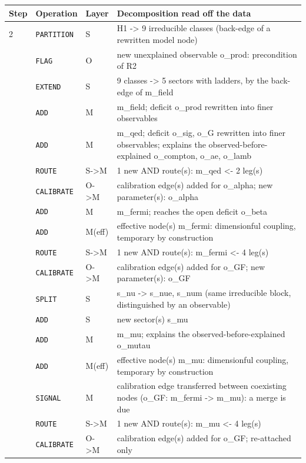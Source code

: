 \begin{longtable}{@{}p{0.6cm}p{1.9cm}p{1.3cm}p{10.5cm}@{}}\toprule
Step & Operation & Layer & Decomposition read off the data \\\midrule\endhead
2 & \texttt{PARTITION} & S & H1 -> 9 irreducible classes (back-edge of a rewritten model node) \\
\addlinespace[2pt]
3 & \texttt{FLAG} & O & new unexplained observable o\_prod: precondition of R2 \\
\addlinespace[2pt]
4 & \texttt{EXTEND} & S & 9 classes -> 5 sectors with ladders, by the back-edge of m\_field \\
 & \texttt{ADD} & M & m\_field; deficit o\_prod rewritten into finer observables \\
\addlinespace[2pt]
5 & \texttt{ADD} & M & m\_qed; deficit o\_sig, o\_G rewritten into finer observables; explains the observed-before-explained o\_compton, o\_ae, o\_lamb \\
 & \texttt{ROUTE} & S->M & 1 new AND route(s): m\_qed <- 2 leg(s) \\
 & \texttt{CALIBRATE} & O->M & calibration edge(s) added for o\_alpha; new parameter(s): o\_alpha \\
\addlinespace[2pt]
6 & \texttt{ADD} & M & m\_fermi; reaches the open deficit o\_beta \\
 & \texttt{ADD} & M(eff) & effective node(s) m\_fermi: dimensionful coupling, temporary by construction \\
 & \texttt{ROUTE} & S->M & 1 new AND route(s): m\_fermi <- 4 leg(s) \\
 & \texttt{CALIBRATE} & O->M & calibration edge(s) added for o\_GF; new parameter(s): o\_GF \\
\addlinespace[2pt]
7 & \texttt{SPLIT} & S & s\_nu -> s\_nue, s\_num (same irreducible block, distinguished by an observable) \\
 & \texttt{ADD} & S & new sector(s) s\_mu \\
 & \texttt{ADD} & M & m\_mu; explains the observed-before-explained o\_mutau \\
 & \texttt{ADD} & M(eff) & effective node(s) m\_mu: dimensionful coupling, temporary by construction \\
 & \texttt{SIGNAL} & M & calibration edge transferred between coexisting nodes (o\_GF: m\_fermi -> m\_mu): a merge is due \\
 & \texttt{ROUTE} & S->M & 1 new AND route(s): m\_mu <- 4 leg(s) \\
 & \texttt{CALIBRATE} & O->M & calibration edge(s) added for o\_GF; re-attached only \\

\end{longtable}
